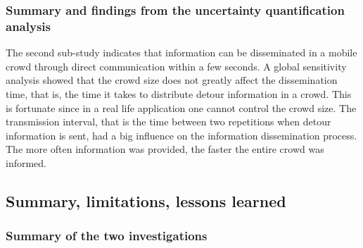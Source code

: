 \subsubsection{Summary and findings from the uncertainty quantification analysis}
The second sub-study indicates that information can be disseminated in a mobile crowd through direct communication within a few seconds. A global sensitivity analysis showed that the crowd size does not greatly affect the dissemination time, that is, the time it takes to distribute detour information in a crowd. This is fortunate since in a real life application one cannot control the crowd size. The transmission interval, that is the time between two repetitions when detour information is sent, had a big influence on the information dissemination process. The more often information was provided, the faster the entire crowd was informed. 
 
\FloatBarrier

\subsection{Summary, limitations, lessons learned}

\subsubsection{Summary of the two investigations}

